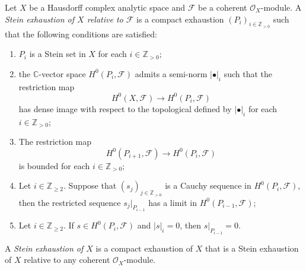 \begin{definition}\label{def-Steinexhaus}
    Let $X$ be a Hausdorff complex analytic space and $\mathcal{F}$ be a coherent $\mathcal{O}_X$-module. 
    A \emph{Stein exhaustion of $X$ relative to $\mathcal{F}$} is a compact exhaustion $(P_i)_{i\in \mathbb{Z}_{>0}}$ such that the following conditions are satisfied:
    \begin{enumerate}
        \item  $P_i$ is a Stein set in $X$ for each $i\in \mathbb{Z}_{>0}$;
        \item the $\mathbb{C}$-vector space $H^0(P_i,\mathcal{F})$ admits a semi-norm $|\bullet|_i$ such that the restriction map 
        \[
            H^0(X,\mathcal{F})\rightarrow H^0(P_i,\mathcal{F})
        \] 
        has dense image with respect to the topological defined by $|\bullet|_i$ for each $i\in \mathbb{Z}_{>0}$;
        \item The restriction map
            \[
                H^0(P_{i+1},\mathcal{F})\rightarrow H^0(P_i,\mathcal{F})
            \]
            is bounded for each $i\in \mathbb{Z}_{>0}$;
        \item Let $i\in \mathbb{Z}_{\geq 2}$. Suppose that $(s_j)_{j\in \mathbb{Z}_{>0}}$ is a Cauchy sequence in $H^0(P_i,\mathcal{F})$, then the restricted sequence $s_j|_{P_{i-1}}$ has a limit in $H^0(P_{i-1},\mathcal{F})$;
        \item Let $i\in \mathbb{Z}_{\geq 2}$. If $s\in H^0(P_i,\mathcal{F})$ and $|s|_i=0$, then $s|_{P_{i-1}}=0$.
    \end{enumerate}

    A \emph{Stein exhaustion of $X$} is a compact exhaustion of $X$ that is a Stein exhaustion of $X$ relative to any coherent $\mathcal{O}_X$-module.
\end{definition}

